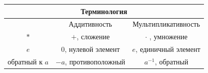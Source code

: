 \documentclass[a4paper, 12pt]{article}
\theoremstyle{definition}
\begin{document}
  \vspace{5pt}
  \begin{center}
    \begin{tabular}{|c|c|c|}
      \hline \multicolumn{3}{|c|}{\textbf{Терминология} } \\ \hline
      \null & Аддитивность & Мультипликативность \\ \hline
      $*$ & $+$, сложение & $\cdot$ , умножение \\ \hline
      $e$ & 0, нулевой элемент & $e$, единичный элемент \\ \hline
      обратный к $a$ & $-a$, противоположный & $a^{-1}$, обратный \\ \hline
    \end{tabular}
  \end{center}
  \vspace{5pt}
\end{document}
